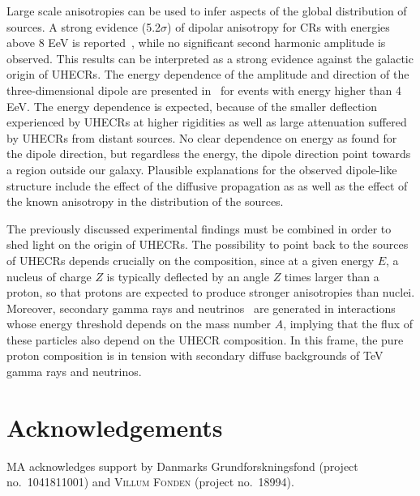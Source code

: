 \documentclass{PoS}
\begin{document}
Large scale anisotropies can be used to infer aspects of the global distribution of sources. A strong evidence (5.2$\sigma$) of dipolar anisotropy for CRs with energies above 8 EeV is reported~\cite{Aab:2017tyv}, while no significant second harmonic amplitude is observed. This results can be interpreted as a strong evidence against the galactic origin of UHECRs. The energy dependence of the amplitude and direction of the three-dimensional dipole are presented in~\cite{Aab:2018mmi} for events with energy higher than 4 EeV. The energy dependence is expected, because of the smaller deflection experienced
by UHECRs at higher rigidities as well as large attenuation suffered by UHECRs from distant sources.  No clear dependence on energy as found for the dipole direction, but regardless the energy, the dipole direction point towards a region outside our galaxy. 
Plausible explanations for the observed dipole-like structure
include the effect of the diffusive propagation as 
as well as the effect of the known anisotropy in the distribution of the sources. 



The previously discussed experimental findings must be combined in order to shed light on the origin of UHECRs. The possibility to point back to the sources of UHECRs depends crucially on the composition, since  
at a given energy $E$, a nucleus of charge $Z$ is typically deflected by an angle $Z$ times larger than a proton, so that protons are expected to produce stronger anisotropies than nuclei. 
Moreover, secondary gamma rays and neutrinos~\cite{AlvesBatista} are generated in 
interactions whose energy threshold depends on the mass number $A$, implying that the flux of these particles also depend on the UHECR composition. In this frame, the pure proton composition is in tension with secondary diffuse backgrounds of TeV gamma rays and neutrinos. 



\section*{Acknowledgements}
MA acknowledges support by Danmarks Grundforskningsfond (project no.~1041811001) and \textsc{Villum Fonden} (project no.~18994).



\end{document}
